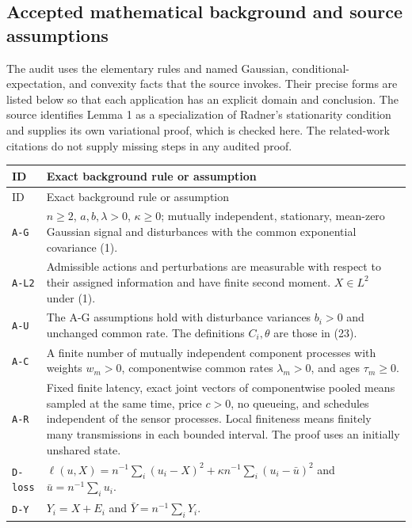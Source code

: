 \documentclass[11pt,letterpaper]{article}
\begin{document}
\subsection{Accepted mathematical background and source assumptions}
The audit uses the elementary rules and named Gaussian, conditional-expectation, and convexity facts that the source invokes. Their precise forms are listed below so that each application has an explicit domain and conclusion. The source identifies Lemma 1 as a specialization of Radner's stationarity condition and supplies its own variational proof, which is checked here. The related-work citations do not supply missing steps in any audited proof.

{\small \begin{longtable}{>{\raggedright\arraybackslash}p{.11\linewidth}>{\raggedright\arraybackslash}p{.79\linewidth}}
\toprule
ID & Exact background rule or assumption \\
\midrule\endfirsthead
\toprule
ID & Exact background rule or assumption \\
\midrule\endhead
\bottomrule\endfoot
\texttt{A-G} & $n\ge2$, $a,b,\lambda>0$, $\kappa\ge0$; mutually independent, stationary, mean-zero Gaussian signal and disturbances with the common exponential covariance (1). \\[3pt]
\texttt{A-L2} & Admissible actions and perturbations are measurable with respect to their assigned information and have finite second moment. $X\in L^2$ under (1). \\[3pt]
\texttt{A-U} & The A-G assumptions hold with disturbance variances $b_i>0$ and unchanged common rate. The definitions $C_i,\theta$ are those in (23). \\[3pt]
\texttt{A-C} & A finite number of mutually independent component processes with weights $w_m>0$, componentwise common rates $\lambda_m>0$, and ages $\tau_m\ge0$. \\[3pt]
\texttt{A-R} & Fixed finite latency, exact joint vectors of componentwise pooled means sampled at the same time, price $c>0$, no queueing, and schedules independent of the sensor processes. Local finiteness means finitely many transmissions in each bounded interval. The proof uses an initially unshared state. \\[3pt]
\texttt{D-loss} & $\ell(u,X)=n^{-1}\sum_i(u_i-X)^2+\kappa n^{-1}\sum_i(u_i-\bar u)^2$ and $\bar u=n^{-1}\sum_i u_i$. \\[3pt]
\texttt{D-Y} & $Y_i=X+E_i$ and $\bar Y=n^{-1}\sum_iY_i$. \\[3pt]

\end{longtable}}
\end{document}
